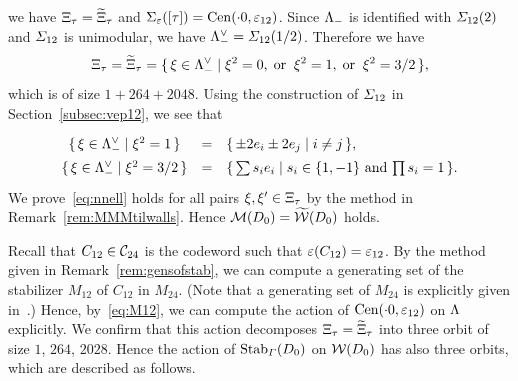 \documentclass{amsart} %
\begin{document}
we have $\Xi_{\tau}=\widetilde{\Xi}_{\tau}$ and $\Sigma_{\varepsilon}([\tau])=\mathrm{Cen}(\cdot 0, \varepsilon_{12})$.
Since $\Lambda_{-}$ is identified with $\varSigma_{12}(2)$ and $\varSigma_{12}$ is unimodular,
we have $\Lambda_{-}^{\vee}= \varSigma_{12}(1/2)$.
Therefore we have 
\[
\Xi_{\tau}=\widetilde{\Xi}_{\tau}=\{\,{\xi\in \Lambda_{-}^{\vee}}\mid {\xi^2=0, \;\textrm{or}\; \; \xi^2=1, \;\textrm{or}\; \; \xi^2=3/2} \,\},
\]
which is of size $1+264+2048$.
Using the construction of $\varSigma_{12}$ in Section~\ref{subsec:vep12},
we see that 
\[
\renewcommand{\arraystretch}{1.4}
\begin{array}{ccl}
\set{\xi\in \Leechminus\dual}{\xi^2=1} &=& \set{\pm 2 e_i\pm 2 e_j}{i\ne j}, \\
\set{\xi\in \Leechminus\dual}{\xi^2=3/2} &=& \set{\sum s_i e_i}{\textrm{$s_i\in \{1, -1\}$ and $\prod s_i=1$}}. \\
\end{array}
\]
%
%
We prove~\eqref{eq:nnell} holds for all pairs $\xi, \xi^{\prime}\in \Xi_{\tau}$
by the method in Remark~\ref{rem:MMMtilwalls}.
Hence 
$\mathord{\mathcal{M}}(D_0)=\widetilde{\mathord{\mathcal{W}}}(D_0)$ holds.
%
\par 
%
Recall that $C_{12}\in \mathord{\mathcal{C}}_{24}$ is the codeword such that $\varepsilon(C_{12})=\varepsilon_{12}$. %
By the method given in Remark~\ref{rem:gensofstab}, 
we can compute a generating set of 
the stabilizer $M_{12}$ of $C_{12}$ in $M_{24}$.
(Note that a generating set of $M_{24}$ is explicitly given in~\cite[Chapter 10, Section 2]{theCSbook}.)
Hence, by~\eqref{eq:M12},
we can compute the action of $\mathrm{Cen}(\cdot 0, \varepsilon_{12})$ on $\Lambda$ explicitly.
We confirm that this action decomposes $\Xi_{\tau}=\widetilde{\Xi}_{\tau}$
into three orbit of size $1$, $264$, $2028$.
Hence the action of $\operatorname{Stab}_{\varGamma}(D_0)$ on $\mathord{\mathcal{W}}(D_0)$ 
has also three orbits,
which are described as follows.
%
\end{document}
